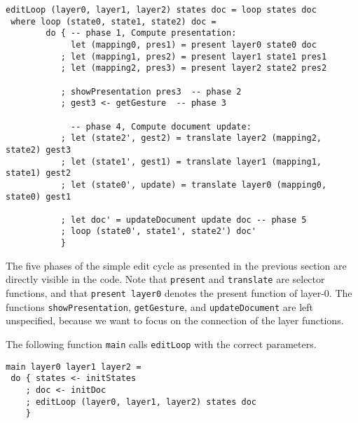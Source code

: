 \begin{small}\begin{verbatim}editLoop (layer0, layer1, layer2) states doc = loop states doc
 where loop (state0, state1, state2) doc = 
        do { -- phase 1, Compute presentation:
             let (mapping0, pres1) = present layer0 state0 doc
           ; let (mapping1, pres2) = present layer1 state1 pres1
           ; let (mapping2, pres3) = present layer2 state2 pres2

           ; showPresentation pres3  -- phase 2
           ; gest3 <- getGesture  -- phase 3
 
             -- phase 4, Compute document update: 
           ; let (state2', gest2) = translate layer2 (mapping2, state2) gest3
           ; let (state1', gest1) = translate layer1 (mapping1, state1) gest2
           ; let (state0', update) = translate layer0 (mapping0, state0) gest1
       
           ; let doc' = updateDocument update doc -- phase 5
           ; loop (state0', state1', state2') doc'
           }\end{verbatim}\end{small}

\par 
\par The five phases of the simple edit cycle as presented in the previous
      section are directly visible in the code. Note that \texttt{present} and
      \texttt{translate} are selector functions, and that \texttt{present layer0}
      denotes the present function of layer-0. The functions
      \texttt{showPresentation}, \texttt{getGesture}, and \texttt{updateDocument} are
      left unspecified, because we want to focus on the connection of the layer
      functions. 
\par The following function \texttt{main} calls \texttt{editLoop} with the
      correct parameters.\begin{small}\begin{verbatim}main layer0 layer1 layer2 = 
 do { states <- initStates
    ; doc <- initDoc 
    ; editLoop (layer0, layer1, layer2) states doc
    }\end{verbatim}\end{small}


